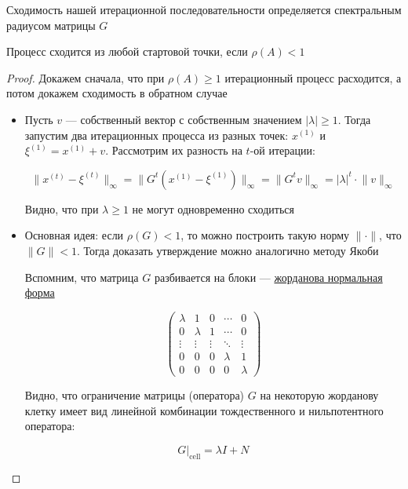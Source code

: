 Сходимость нашей итерационной последовательности определяется спектральным радиусом матрицы $G$

\begin{claim}\label{convergence_iter_sle}
    Процесс сходится из любой стартовой точки, если $\rho(A) < 1$
\end{claim}

\begin{proof}
    Докажем сначала, что при $\rho(A) \geqslant 1$ итерационный процесс расходится, а потом докажем сходимость в обратном случае
    \begin{itemize}
        \item Пусть $v$ --- собственный вектор с собственным значением $| \lambda | \geqslant 1$. Тогда запустим два итерационных процесса из разных точек: $x^{(1)}$ и $\xi^{(1)} = x^{(1)} + v$. Рассмотрим их разность на $t$-ой итерации:

        \[
        \lVert x^{(t)} - \xi^{(t)} \rVert_{\infty} = \lVert G^{t} (x^{(1)} - \xi^{(1)}) \rVert_{\infty} = \lVert G^{t} v \rVert_{\infty} = | \lambda |^t \cdot \lVert v \rVert_{\infty}
        \]

        Видно, что при $\lambda \geqslant 1$ не могут одновременно сходиться

        \item Основная идея: если $\rho(G) < 1$, то можно построить такую норму $\lVert \cdot \rVert$, что $\lVert G \rVert < 1$. Тогда доказать утверждение можно аналогично методу Якоби

        Вспомним, что матрица $G$ разбивается на блоки --- \href{https://en.wikipedia.org/wiki/Jordan_normal_form}{жорданова нормальная форма}

        \[
        \begin{pmatrix}
        \lambda & 1       & 0      & \cdots  & 0 \\
        0       & \lambda & 1      & \cdots  & 0 \\
        \vdots  & \vdots  & \vdots & \ddots  & \vdots \\
        0       & 0       & 0      & \lambda & 1      \\
        0       & 0       & 0      & 0       & \lambda
        \end{pmatrix}
        \]

        Видно, что ограничение матрицы (оператора) $G$ на некоторую жорданову клетку имеет вид линейной комбинации тождественного и нильпотентного оператора:

        \[
        G|_{\mathrm{cell}} = \lambda I + N
        \]


\end{itemize}
\end{proof}
